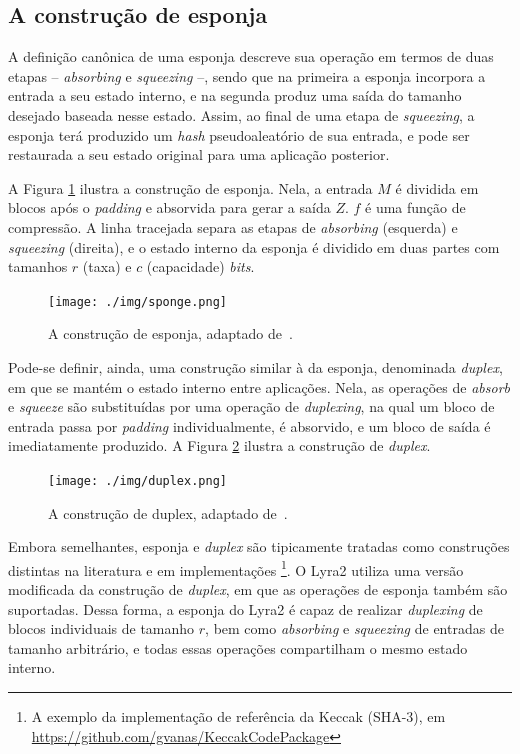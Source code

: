 \documentclass{article}
\begin{document}
\subsection{A construção de esponja}

A definição canônica de uma esponja \cite{sponge} descreve sua operação
em termos de duas etapas -- \emph{absorbing} e \emph{squeezing} --,
sendo que na primeira a esponja incorpora a entrada a seu estado
interno, e na segunda produz uma saída do tamanho desejado baseada nesse
estado. Assim, ao final de uma etapa de \emph{squeezing}, a esponja terá
produzido um \emph{hash} pseudoaleatório de sua entrada, e pode ser
restaurada a seu estado original para uma aplicação posterior.

A Figura \ref{img-sponge} ilustra a construção de esponja. Nela, a
entrada $M$ é dividida em blocos após o \emph{padding} e absorvida
para gerar a saída $Z$. $f$ é uma função de compressão. A linha
tracejada separa as etapas de \emph{absorbing} (esquerda) e
\emph{squeezing} (direita), e o estado interno da esponja é dividido em
duas partes com tamanhos $r$ (taxa) e $c$ (capacidade)
\emph{bits}.

\begin{figure}[htbp]
\centering
\texttt{[image: ./img/sponge.png]}
\caption{A construção de esponja, adaptado de~\cite{sponge}.\label{img-sponge}}
\end{figure}

Pode-se definir, ainda, uma construção similar à da esponja, denominada
\emph{duplex}, em que se mantém o estado interno entre aplicações. Nela, as
operações de \emph{absorb} e \emph{squeeze} são substituídas por uma operação
de \emph{duplexing}, na qual um bloco de entrada passa por \emph{padding}
individualmente, é absorvido, e um bloco de saída é imediatamente produzido. A
Figura \ref{img-duplex} ilustra a construção de \emph{duplex}.

\begin{figure}[htbp]
\centering
\texttt{[image: ./img/duplex.png]}
\caption{A construção de duplex, adaptado de~\cite{sponge}.\label{img-duplex}}
\end{figure}

Embora semelhantes, esponja e \emph{duplex} são tipicamente tratadas como
construções distintas na literatura \cite{sponge} e em implementações
\footnote{A exemplo da implementação de referência da Keccak (SHA-3), em
\url{https://github.com/gvanas/KeccakCodePackage}}. O Lyra2 utiliza uma versão
modificada da construção de \emph{duplex}, em que as operações de esponja
também são suportadas. Dessa forma, a esponja do Lyra2 é capaz de realizar
\emph{duplexing} de blocos individuais de tamanho $r$, bem como
\emph{absorbing} e \emph{squeezing} de entradas de tamanho arbitrário, e todas
essas operações compartilham o mesmo estado interno.
\end{document}
